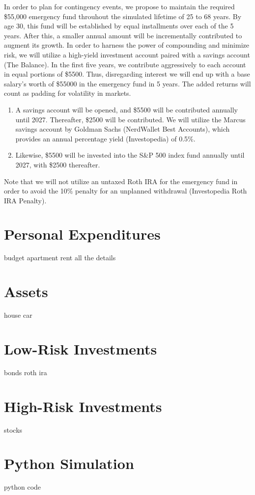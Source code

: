 \documentclass[12pt]{article}
\begin{document}
In order to plan for contingency events, we propose to maintain the required \$55,000 emergency
fund throuhout the simulated lifetime of 25 to 68 years. By age 30, this fund will be established
by equal installments over each of the 5 years. After this, a smaller annual amount will be incrementally contributed to augment its growth.
In order to harness the power of compounding and minimize risk, we will utilize a high-yield investment account
paired with a savings account (The Balance). In the first five years, we contribute aggressively to each account in equal portions of \$5500.
Thus, disregarding interest we will end up with a base salary's worth of \$55000 in the emergency fund in 5 years.
The added returns will count as padding for volatility in markets.

\begin{enumerate}
    \item A savings account will be opened, and \$5500 will be contributed annually until 2027. Thereafter, \$2500 will be contributed.
    We will utilize the Marcus savings account by Goldman Sachs (NerdWallet Best Accounts), which provides an annual percentage yield (Investopedia) of 0.5\%.
    \item Likewise, \$5500 will be invested into the S\&P 500 index fund annually until 2027, with \$2500 thereafter.
\end{enumerate}

Note that we will not utilize an untaxed Roth IRA for the emergency fund in order to avoid the 10\% penalty for an unplanned withdrawal (Investopedia Roth IRA Penalty).

\section{Personal Expenditures}

budget
apartment rent
all the details

\section{Assets}

house
car

\section{Low-Risk Investments}

bonds
roth ira

\section{High-Risk Investments}

stocks

\section{Python Simulation}

python code
\end{document}
